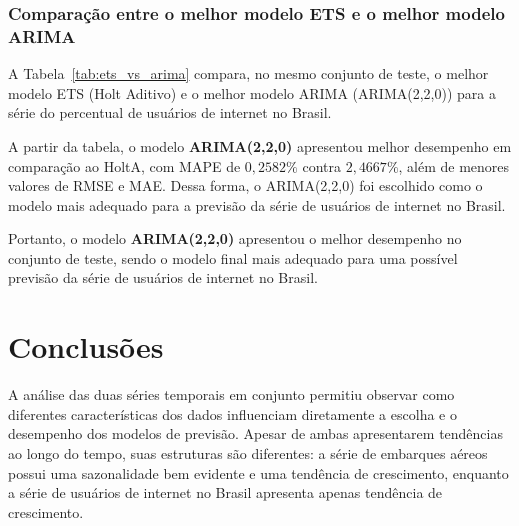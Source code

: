 \documentclass[12pt, a4paper]{article}
\begin{document}
\subsubsection{Comparação entre o melhor modelo ETS e o melhor modelo ARIMA}

A Tabela~\ref{tab:ets_vs_arima} compara, no mesmo conjunto de teste, o melhor modelo ETS (Holt Aditivo) e o melhor modelo ARIMA (ARIMA(2,2,0)) para a série do percentual de usuários de internet no Brasil.

\begin{table}[H]
  \centering
  \caption{Comparação final entre o melhor modelo ETS e o melhor modelo ARIMA.}
  \label{tab:ets_vs_arima}
\end{table}

A partir da tabela, o modelo \textbf{ARIMA(2,2,0)} apresentou melhor desempenho em comparação ao HoltA, com MAPE de $0,2582\%$ contra $2,4667\%$, além de menores valores de RMSE e MAE. Dessa forma, o ARIMA(2,2,0) foi escolhido como o modelo mais adequado para a previsão da série de usuários de internet no Brasil.

Portanto, o modelo \textbf{ARIMA(2,2,0)} apresentou o melhor desempenho no conjunto de teste, sendo o modelo final mais adequado para uma possível previsão da série de usuários de internet no Brasil.
\section{Conclusões}
\label{sec:conclusao}

A análise das duas séries temporais em conjunto permitiu observar como diferentes características dos dados influenciam diretamente a escolha e o desempenho dos modelos de previsão. Apesar de ambas apresentarem tendências ao longo do tempo, suas estruturas são diferentes: a série de embarques aéreos possui uma sazonalidade bem evidente e uma tendência de crescimento, enquanto a série de usuários de internet no Brasil apresenta apenas tendência de crescimento.
\end{document}
